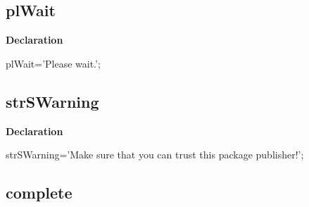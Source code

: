 \documentclass{report}
\newif\ifpdf
\begin{document}
\subsection*{plWait}
\fi
\label{trstrings-plWait}
\begin{list}{}{
\setlength{\itemindent}{0cm}
\setlength{\listparindent}{0cm}
\setlength{\leftmargin}{\evensidemargin}
\addtolength{\leftmargin}{\tmplength}
\settowidth{\labelsep}{X}
\addtolength{\leftmargin}{\labelsep}
\setlength{\labelwidth}{\tmplength}
}
\item[\textbf{Declaration}\hfill]
\ifpdf
\begin{flushleft}
\fi
\begin{ttfamily}
plWait='Please wait.';\end{ttfamily}

\ifpdf
\end{flushleft}
\fi

\end{list}
\ifpdf
\subsection*{\large{\textbf{strSWarning}}\normalsize\hspace{1ex}\hrulefill}
\else
\subsection*{strSWarning}
\fi
\label{trstrings-strSWarning}
\begin{list}{}{
\setlength{\itemindent}{0cm}
\setlength{\listparindent}{0cm}
\setlength{\leftmargin}{\evensidemargin}
\addtolength{\leftmargin}{\tmplength}
\settowidth{\labelsep}{X}
\addtolength{\leftmargin}{\labelsep}
\setlength{\labelwidth}{\tmplength}
}
\item[\textbf{Declaration}\hfill]
\ifpdf
\begin{flushleft}
\fi
\begin{ttfamily}
strSWarning='Make sure that you can trust this package publisher!';\end{ttfamily}

\ifpdf
\end{flushleft}
\fi

\end{list}
\ifpdf
\subsection*{\large{\textbf{complete}}\normalsize\hspace{1ex}\hrulefill}
\else
\end{document}
